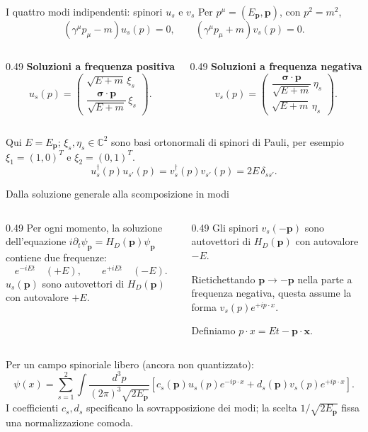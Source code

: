\begin{frame}{I quattro modi indipendenti: spinori $u_s$ e $v_s$}
\small
Per $p^\mu=(E_{\mathbf p},\mathbf p)$, con $p^2=m^2$,
\[
 (\gamma^\mu p_\mu-m)u_s(p)=0,\qquad
 (\gamma^\mu p_\mu+m)v_s(p)=0.
\]
\begin{columns}[T,onlytextwidth]
\begin{column}{0.49\textwidth}
\textbf{Soluzioni a frequenza positiva}
\[
 u_s(p)=\begin{pmatrix}
 \sqrt{E+m}\,\xi_s\\[2mm]
 \dfrac{\boldsymbol\sigma\cdot\mathbf p}{\sqrt{E+m}}\,\xi_s
 \end{pmatrix}.
\]
\end{column}
\begin{column}{0.49\textwidth}
\textbf{Soluzioni a frequenza negativa}
\[
 v_s(p)=\begin{pmatrix}
 \dfrac{\boldsymbol\sigma\cdot\mathbf p}{\sqrt{E+m}}\,\eta_s\\[2mm]
 \sqrt{E+m}\,\eta_s
 \end{pmatrix}.
\]
\end{column}
\end{columns}
\medskip
Qui $E=E_{\mathbf p}$; $\xi_s,\eta_s\in\mathbb C^2$ sono basi
ortonormali di spinori di Pauli, per esempio
$\xi_1=(1,0)^T$ e $\xi_2=(0,1)^T$.
\[
 u_s^\dagger(p)u_{s'}(p)=v_s^\dagger(p)v_{s'}(p)
 =2E\,\delta_{ss'}.
\]
\end{frame}

\begin{frame}{Dalla soluzione generale alla scomposizione in modi}
\small
\begin{columns}[T,onlytextwidth]
\begin{column}{0.49\textwidth}
Per ogni momento, la soluzione dell'equazione
$ i\partial_t\psi_{\mathbf p}=H_D(\mathbf p)\psi_{\mathbf p}$
contiene due frequenze:
\[
 e^{-iEt}\quad(+E),\qquad
 e^{+iEt}\quad(-E).
\]
$u_s(\mathbf p)$ sono autovettori di $H_D(\mathbf p)$
con autovalore $+E$.
\end{column}
\begin{column}{0.49\textwidth}
Gli spinori $v_s(-\mathbf p)$ sono autovettori
di $H_D(\mathbf p)$ con autovalore $-E$.

Rietichettando $\mathbf p\to-\mathbf p$ nella parte
a frequenza negativa, questa assume la forma
$ v_s(p)e^{+ip\cdot x}$.

Definiamo $p\cdot x=Et-\mathbf p\cdot\mathbf x$.
\end{column}
\end{columns}
\medskip
Per un campo spinoriale libero (ancora non quantizzato):
\[
 \psi(x)=\sum_{s=1}^{2}\int\frac{d^3p}{(2\pi)^3\sqrt{2E_{\mathbf p}}}
 \left[c_s(\mathbf p)u_s(p)e^{-ip\cdot x}
 +d_s(\mathbf p)v_s(p)e^{+ip\cdot x}\right].
\]
I coefficienti $c_s,d_s$ specificano la sovrapposizione dei modi;
la scelta $1/\sqrt{2E_{\mathbf p}}$ fissa una normalizzazione comoda.
\end{frame}

